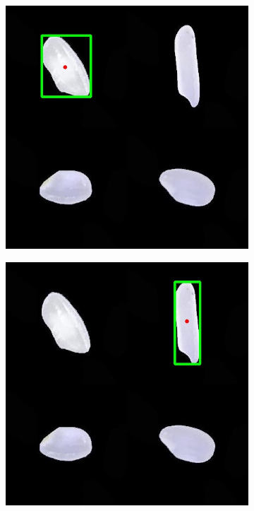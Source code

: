 \documentclass{article}
\begin{document}
\begin{figure} [!htb]
	\centering
	\begin{subfigure}[b]{0.2\textwidth}
		\includegraphics[width= \textwidth]{fg/ccl_bbox_centroid_2.jpg}
        \caption{}
	\end{subfigure}
	\begin{subfigure}[b]{0.2\textwidth}
		\includegraphics[width= \textwidth]{fg/ccl_bbox_centroid_1.jpg}

\end{subfigure}
\end{figure}
\end{document}
